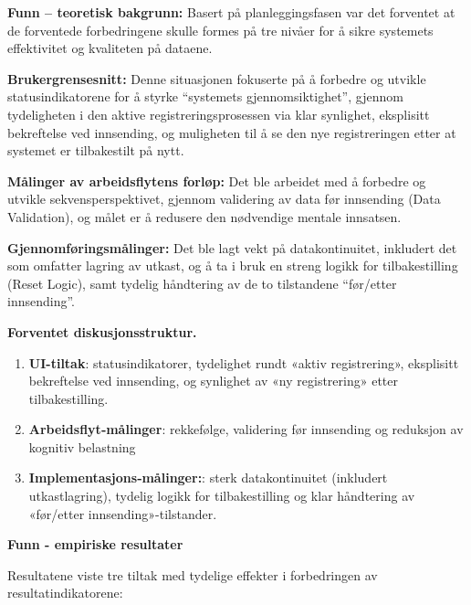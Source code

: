 \textbf{Funn – teoretisk bakgrunn: } 
Basert på planleggingsfasen var det forventet at de forventede forbedringene skulle formes på tre nivåer for å sikre systemets effektivitet og kvaliteten på dataene.

\textbf{Brukergrensesnitt:} Denne situasjonen fokuserte på å forbedre og utvikle statusindikatorene for å styrke ``systemets gjennomsiktighet'', gjennom tydeligheten i den aktive registreringsprosessen via klar synlighet, eksplisitt bekreftelse ved innsending, og muligheten til å se den nye registreringen etter at systemet er tilbakestilt på nytt.

\textbf{Målinger av arbeidsflytens forløp:} Det ble arbeidet med å forbedre og utvikle sekvensperspektivet, gjennom validering av data før innsending (Data Validation), og målet er å redusere den nødvendige mentale innsatsen.

\textbf{Gjennomføringsmålinger:} Det ble lagt vekt på datakontinuitet, inkludert det som omfatter lagring av utkast, og å ta i bruk en streng logikk for tilbakestilling (Reset Logic), samt tydelig håndtering av de to tilstandene ``før/etter innsending''.

\textbf{Forventet diskusjonsstruktur.}
\begin{enumerate}
  \item \textbf{UI-tiltak}: statusindikatorer, tydelighet rundt «aktiv registrering», eksplisitt bekreftelse ved innsending, og synlighet av «ny registrering» etter tilbakestilling.
  \item \textbf{Arbeidsflyt‑målinger}: rekkefølge, validering før innsending og reduksjon av kognitiv belastning
  \item \textbf{Implementasjons‑målinger:}: sterk datakontinuitet (inkludert utkastlagring), tydelig logikk for tilbakestilling og klar håndtering av «før/etter innsending»-tilstander.
\end{enumerate}

\textbf{Funn - empiriske resultater}

Resultatene viste tre tiltak med tydelige effekter i forbedringen av resultatindikatorene:

